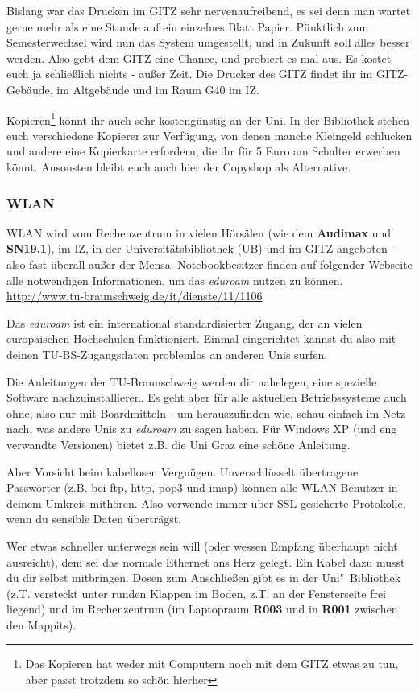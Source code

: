 \begin{multicols}{2}
		Bislang war das Drucken im GITZ sehr nervenaufreibend, es sei denn man wartet gerne mehr als eine Stunde auf ein einzelnes Blatt Papier. Pünktlich zum Semesterwechsel wird nun das System umgestellt, und in Zukunft soll alles besser werden. Also gebt dem GITZ eine Chance, und probiert es mal aus. Es kostet euch ja schließlich nichts - außer Zeit. Die Drucker des GITZ findet ihr im GITZ-Gebäude, im Altgebäude und im Raum G40 im IZ.

		Kopieren\footnote{Das Kopieren hat weder mit Computern noch mit dem GITZ etwas zu tun, aber passt trotzdem so schön hierher} könnt ihr auch sehr kostengünstig an der Uni. In der Bibliothek stehen euch verschiedene Kopierer zur Verfügung, von denen manche Kleingeld schlucken und andere eine Kopierkarte erfordern, die ihr für 5 Euro am Schalter erwerben könnt. Ansonsten bleibt euch auch hier der Copyshop als Alternative.

	\subsubsection{WLAN}
		\label{wlan}
		WLAN wird vom Rechenzentrum in vielen Hörsälen (wie dem \textbf{Audimax} und \textbf{SN19.1}), im IZ, in der Universitätsbibliothek (UB) und im GITZ angeboten - also fast überall außer der Mensa. Notebookbesitzer finden auf folgender Webseite alle notwendigen Informationen, um das \emph{eduroam} nutzen zu können. \url{http://www.tu-braunschweig.de/it/dienste/11/1106}

		Das \emph{eduroam} ist ein international standardisierter Zugang, der an vielen europäischen Hochschulen funktioniert. Einmal eingerichtet kannst du also mit deinen TU-BS-Zugangsdaten problemlos an anderen Unis surfen.

		Die Anleitungen der TU-Braunschweig werden dir nahelegen, eine spezielle Software nachzuinstallieren. Es geht aber für alle aktuellen Betriebssysteme auch ohne, also nur mit Boardmitteln - um herauszufinden wie, schau einfach im Netz nach, was andere Unis zu \emph{eduroam} zu sagen haben. Für Windows XP (und eng verwandte Versionen) bietet z.B. die Uni Graz eine schöne Anleitung.

		Aber Vorsicht beim kabellosen Vergnügen. Unverschlüsselt übertragene Passwörter (z.B. bei ftp, http, pop3 und imap) können alle WLAN Benutzer in deinem Umkreis mithören. Also verwende immer über SSL gesicherte Protokolle, wenn du sensible Daten überträgst.

		Wer etwas schneller unterwegs sein will (oder wessen Empfang überhaupt nicht ausreicht), dem sei das normale Ethernet ans Herz gelegt. Ein Kabel dazu musst du dir selbst mitbringen. Dosen zum Anschließen gibt es in der Uni"~Bibliothek (z.T. versteckt unter runden Klappen im Boden, z.T. an der Fensterseite frei liegend) und im Rechenzentrum (im Laptopraum \textbf{R003} und in \textbf{R001} zwischen den Mappits).


\end{multicols}
